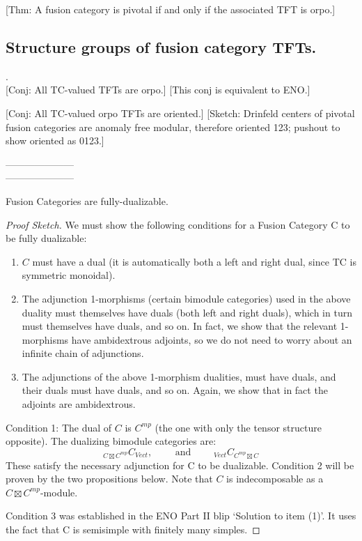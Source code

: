 \documentclass{amsart}
\begin{document}
	[Thm: A fusion category is pivotal if and only if the associated TFT is orpo.]

\subsection{Structure groups of fusion category TFTs.} .\\

	[Conj: All TC-valued TFTs are orpo.] [This conj is equivalent to ENO.]
	
	[Conj: All TC-valued orpo TFTs are oriented.] [Sketch: Drinfeld centers of pivotal fusion categories are anomaly free modular, therefore oriented 123; pushout to show oriented as 0123.]



\nid ---------------------\\
---------------------

\begin{theorem}
	Fusion Categories are fully-dualizable. 
\end{theorem}
	
\begin{proof}[Proof Sketch]
We must show the following conditions for a Fusion Category C to be fully dualizable: 
	\begin{enumerate}
		\item $C$ must have a dual (it is automatically both a left and right dual, since TC is symmetric monoidal).
		\item The adjunction 1-morphisms (certain bimodule categories) used in the above duality must themselves have duals (both left and right duals), which in turn must themselves have duals, and so on.  In fact, we show that the relevant 1-morphisms have ambidextrous adjoints, so we do not need to worry about an infinite chain of adjunctions.
		\item The adjunctions of the above 1-morphism dualities, must have duals, and their duals must have duals, and so on.  Again, we show that in fact the adjoints are ambidextrous.
	\end{enumerate}

Condition 1: The dual of $C$ is $C^{mp}$ (the one with only the tensor structure opposite). The dualizing bimodule categories are:
\begin{equation*}
	{}_{C \boxtimes C^{mp}} C_{Vect}, \qquad \text{ and } \qquad {}_{Vect} C_{C^{mp} \boxtimes C}	
\end{equation*} 
These satisfy the necessary adjunction for C to be dualizable. 
Condition 2 will be proven by the two propositions below. Note that $C$ is indecomposable as a $C \boxtimes C^{mp}$-module.  
	
Condition 3 was established in the ENO Part II blip `Solution to item (1)'.  It uses the fact that C is semisimple with finitely many simples. 	
	
\end{proof}	
	
\end{document}
